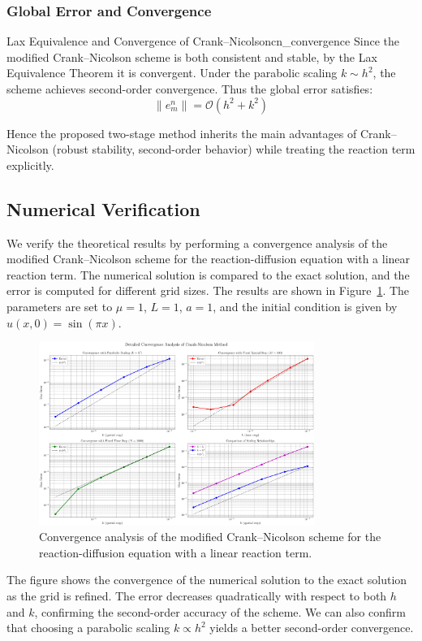 \subsubsection{Global Error and Convergence}
\begin{theorem}{Lax Equivalence and Convergence of Crank--Nicolson}{cn_convergence}
  Since the modified Crank--Nicolson scheme is both consistent and stable, by the Lax Equivalence Theorem it is convergent. Under the parabolic scaling $k \sim h^2$, the scheme achieves
  second-order convergence. Thus the global error satisfies:
  \[
    \|e_m^n\| = \mathcal{O}\!\left(h^2 + k^2\right)
  \]
\end{theorem}
Hence the proposed two-stage method inherits the main advantages of Crank--Nicolson (robust stability, second-order behavior) while treating the reaction term explicitly.
\subsection{Numerical Verification}
We verify the theoretical results by performing a convergence analysis of the modified Crank--Nicolson scheme for the reaction-diffusion equation with a linear reaction term. The numerical solution is compared to the exact solution, and the error is computed for different grid sizes. The results are shown in Figure~\ref{fig:convergence_analysis_2d}.
The parameters are set to \(\mu = 1\), \(L = 1\), \(a = 1\), and the initial condition is given by \(u(x,0) = \sin(\pi x)\).
\begin{figure}[H]
  \centering
  \includegraphics[width=0.8\textwidth]{figures/convergence_analysis_2d.png}
  \caption{Convergence analysis of the modified Crank--Nicolson scheme for the reaction-diffusion equation with a linear reaction term.}
  \label{fig:convergence_analysis_2d}
\end{figure}
The figure shows the convergence of the numerical solution to the exact solution as the grid is refined.
The error decreases quadratically with respect to both \(h\) and \(k\), confirming the second-order accuracy of the scheme.
We can also confirm that choosing a parabolic scaling \(k \propto h^2\) yields a better second-order convergence.






